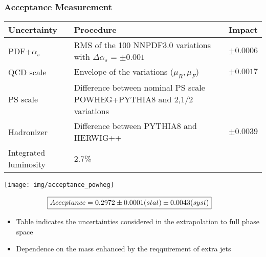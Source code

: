 \documentclass{beamer}
\begin{document}
\begin{frame}
\frametitle{Acceptance Measurement}
\begin{table}[htb]
\tiny
\begin{tabular}{lll}
\hline
 Uncertainty &  Procedure & Impact\\
\hline
PDF+$\alpha_s$  & RMS of the 100 NNPDF3.0 variations with $\Delta \alpha_s$ = $\pm 0.001$ & $\pm 0.0006$\\
QCD scale & Envelope of the variations ($\mu_R,\mu_F$) & $\pm0.0017$\\
PS scale & Difference between nominal PS scale POWHEG+PYTHIA8 and 2,1/2 variations & {}\\
Hadronizer & Difference between PYTHIA8 and HERWIG++ & $\pm0.0039$\\
Integrated luminosity & 2.7\% & {}\\
\hline
\end{tabular}
\end{table}
\vspace{-0.5cm}
\begin{center}
\texttt{[image: img/acceptance\_powheg]}
\end{center}
\vspace{-0.5cm}
\begin{align}
\Aboxed{Acceptance = 0.2972\pm0.0001(stat)\pm0.0043(syst)}\nonumber
\end{align}
\vspace{-0.5cm}
\begin{itemize}
\scriptsize
\item Table indicates the uncertainties considered in the extrapolation to full phase space
\item Dependence on the mass enhanced by the reqquirement of extra jets
\end{itemize}
\end{frame}
\end{document}
